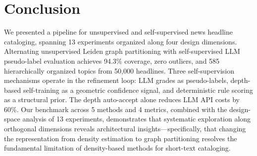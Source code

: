 \documentclass[10pt,twocolumn,twoside]{article}
\begin{document}
\section{Conclusion}

We presented a pipeline for unsupervised and self-supervised news headline cataloging, 
spanning 13 experiments organized along four design dimensions. Alternating unsupervised 
Leiden graph partitioning with self-supervised LLM pseudo-label evaluation achieves 94.3\% 
coverage, zero outliers, and 585 hierarchically organized topics from 50,000 headlines. 
Three self-supervision mechanisms operate in the refinement loop: LLM grades as pseudo-labels, 
depth-based self-training as a geometric confidence signal, and deterministic rule scoring 
as a structural prior. The depth auto-accept alone reduces LLM API costs by 60\%. Our 
benchmark across 5 methods and 4 metrics, combined with the design-space analysis of 13 
experiments, demonstrates that systematic exploration along orthogonal dimensions reveals 
architectural insights---specifically, that changing the representation from density 
estimation to graph partitioning resolves the fundamental limitation of density-based 
methods for short-text cataloging.
\end{document}
